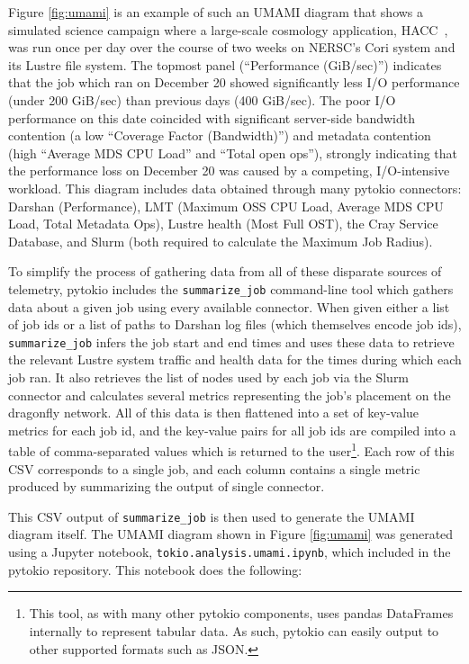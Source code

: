 Figure \ref{fig:umami} is an example of such an UMAMI diagram that shows a simulated science campaign where a large-scale cosmology application, HACC~\cite{Habib2012}, was run once per day over the course of two weeks on NERSC's Cori system and its Lustre file system.
The topmost panel (``Performance (GiB/sec)'') indicates that the job which ran on December 20 showed significantly less I/O performance (under 200 GiB/sec) than previous days (400 GiB/sec).
The poor I/O performance on this date coincided with significant server-side bandwidth contention (a low ``Coverage Factor (Bandwidth)'') and metadata contention (high ``Average MDS CPU Load'' and ``Total open ops''), strongly indicating that the performance loss on December 20 was caused by a competing, I/O-intensive workload.
This diagram includes data obtained through many pytokio connectors: Darshan (Performance), LMT (Maximum OSS CPU Load, Average MDS CPU Load, Total Metadata Ops), Lustre health (Most Full OST), the Cray Service Database, and Slurm (both required to calculate the Maximum Job Radius).

To simplify the process of gathering data from all of these disparate sources of telemetry, pytokio includes the \texttt{summarize\_job} command-line tool which gathers data about a given job using every available connector.
When given either a list of job ids or a list of paths to Darshan log files (which themselves encode job ids), \texttt{summarize\_job} infers the job start and end times and uses these data to retrieve the relevant Lustre system traffic and health data for the times during which each job ran.
It also retrieves the list of nodes used by each job via the Slurm connector and calculates several metrics representing the job's placement on the dragonfly network.
All of this data is then flattened into a set of key-value metrics for each job id, and the key-value pairs for all job ids are compiled into a table of comma-separated values which is returned to the user\footnote{This tool, as with many other pytokio components, uses pandas DataFrames internally to represent tabular data.  As such, pytokio can easily output to other supported formats such as JSON.}.
Each row of this CSV corresponds to a single job, and each column contains a single metric produced by summarizing the output of single connector.

This CSV output of \texttt{summarize\_job} is then used to generate the UMAMI diagram itself.
The UMAMI diagram shown in Figure \ref{fig:umami} was generated using a Jupyter notebook, \texttt{tokio.analysis.umami.ipynb}, which included in the pytokio repository.
This notebook does the following:

